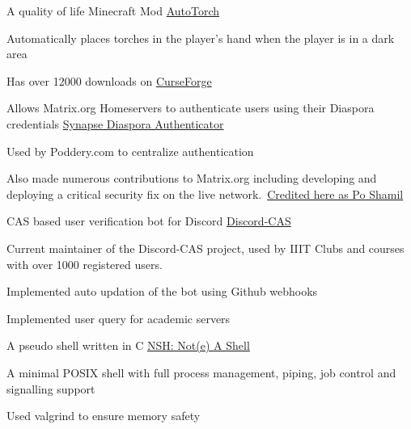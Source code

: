\begin{cventries}
    
    \cventry
    {A quality of life Minecraft Mod} %
    {\href{https://www.curseforge.com/minecraft/mc-mods/auto-torch}{AutoTorch}} %
    {} %
    {} %
    {
      \begin{cvitems} %
        \item {Automatically places torches in the player's hand when the player is in a dark area}
        \item {Has over 12000 downloads on \href{https://www.curseforge.com/minecraft/mc-mods/auto-torch}{CurseForge}}
    \end{cvitems}
    }
       
     
    \cventry
    {Allows Matrix.org Homeservers to authenticate users using their Diaspora credentials} %
    {\href{https://matrix.org/docs/projects/other/synapse-diaspora-auth}{Synapse Diaspora Authenticator}} %
    {} %
    {} %
    {
      \begin{cvitems} %
        \item {Used by Poddery.com to centralize authentication}
        \item {Also made numerous contributions to Matrix.org including developing and deploying a critical security fix on the live network.\
         \href{https://matrix.org/blog/2018/05/01/security-update-synapse-0-28-1/}{Credited here as Po Shamil}}
      \end{cvitems}
    }
    
    
    \cventry
    {CAS based user verification bot for Discord} %
    {\href{https://github.com/Opensource-IIITH/Discord-CAS}{Discord-CAS}} %
    {} %
    {} %
    {
      \begin{cvitems} %
        \item {Current maintainer of the Discord-CAS project, used by IIIT Clubs and courses with over 1000 registered users.}
        \item {Implemented auto updation of the bot using Github webhooks}
        \item {Implemented user query for academic servers}
      \end{cvitems}
    }
    
    
    \cventry
    {A pseudo shell written in C} %
    {\href{https://github.com/necessary129/nsh}{NSH: Not(e) A Shell}} %
    {} %
    {} %
    {
      \begin{cvitems} %
          \item {A minimal POSIX shell with full process management, piping, job control and signalling support}
          \item {Used valgrind to ensure memory safety}
      \end{cvitems}
    }
\end{cventries}
